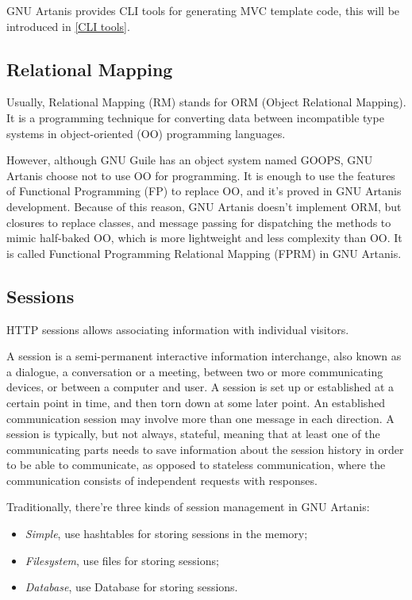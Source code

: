 \documentclass[numbers,numberedpars]{sigplanconf}
\begin{document}
GNU Artanis provides CLI tools for generating MVC template code, this will be introduced in \ref{CLI tools}.

\subsection{Relational Mapping}

Usually, Relational Mapping (RM) stands for ORM (Object Relational Mapping).
It is a programming technique for converting data between incompatible type systems in object-oriented (OO) programming languages.

However, although GNU Guile has an object system named GOOPS, GNU Artanis choose not to use OO for programming. It is enough
to use the features of Functional Programming (FP) to replace OO, and it's proved in GNU Artanis development. Because of this reason, GNU Artanis
doesn't implement ORM, but closures to replace classes, and message passing for dispatching the methods to mimic half-baked OO, which is more
lightweight and less complexity than OO. It is called Functional Programming Relational Mapping (FPRM) in GNU Artanis.

\subsection{Sessions}

HTTP sessions allows associating information with individual visitors.

A session is a semi-permanent interactive information interchange, also known as a dialogue, a conversation or a meeting, between two or more
communicating devices, or between a computer and user. A session is set up or established at a certain point in time, and then
torn down at some later point. An established communication session may involve more than one message in each direction. A session is typically,
but not always, stateful, meaning that at least one of the communicating parts needs to save information about the session history in order to be
able to communicate, as opposed to stateless communication, where the communication consists of independent requests with responses.

Traditionally, there're three kinds of session management in GNU Artanis:

\begin{itemize}
\item {\it Simple}, use hashtables for storing sessions in the memory;
\item {\it Filesystem}, use files for storing sessions;
\item {\it Database}, use Database for storing sessions.
\end{itemize}
\end{document}
